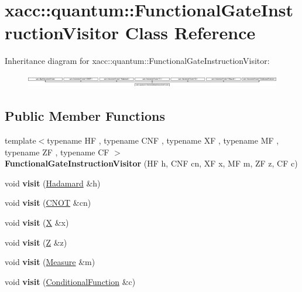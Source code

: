 \hypertarget{a01240}{}\section{xacc\+:\+:quantum\+:\+:Functional\+Gate\+Instruction\+Visitor Class Reference}
\label{a01240}
Inheritance diagram for xacc\+:\+:quantum\+:\+:Functional\+Gate\+Instruction\+Visitor\+:\begin{figure}[H]
\begin{center}
\leavevmode
\includegraphics[height=0.563380cm]{a01240}
\end{center}
\end{figure}
\subsection*{Public Member Functions}
\begin{DoxyCompactItemize}
\item 
\mbox{\label{a01240_a88d6b032e70cfa05f0a7bcee8dbc958a}} 
{\footnotesize template$<$typename HF , typename C\+NF , typename XF , typename MF , typename ZF , typename CF $>$ }\\{\bfseries Functional\+Gate\+Instruction\+Visitor} (HF h, C\+NF cn, XF x, MF m, ZF z, CF c)
\item 
\mbox{\label{a01240_ac5245d34429dc112e7cd0e371108fcb5}} 
void {\bfseries visit} (\hyperlink{a01308}{Hadamard} \&h)
\item 
\mbox{\label{a01240_ad4eddafe8ca3906cd4aa5b98087a789a}} 
void {\bfseries visit} (\hyperlink{a01300}{C\+N\+OT} \&cn)
\item 
\mbox{\label{a01240_ac5d184daee7e755c9ede67b34bc2d091}} 
void {\bfseries visit} (\hyperlink{a01320}{X} \&x)
\item 
\mbox{\label{a01240_a4baf19da581fa9875739a227aba9cf60}} 
void {\bfseries visit} (\hyperlink{a01324}{Z} \&z)
\item 
\mbox{\label{a01240_ad946faf8e2b6eff3e9e142907ec8e05a}} 
void {\bfseries visit} (\hyperlink{a01312}{Measure} \&m)
\item 
\mbox{\label{a01240_a5cdb38902c241e7ae672a2631f1d61f3}} 
void {\bfseries visit} (\hyperlink{a01304}{Conditional\+Function} \&c)
\end{DoxyCompactItemize}
